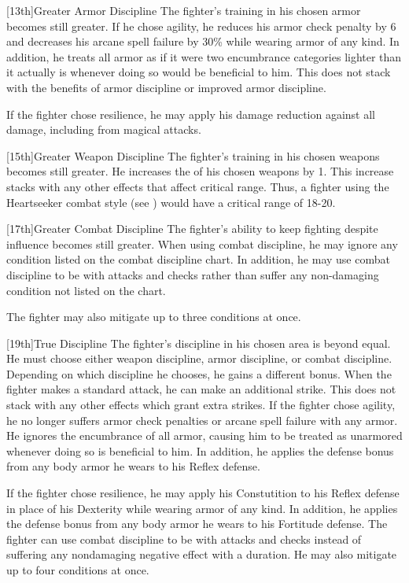[13th]{Greater Armor Discipline}
The fighter's training in his chosen armor becomes still greater.
If he chose agility, he reduces his armor check penalty by 6 and decreases his arcane spell failure by 30\% while wearing armor of any kind.
In addition, he treats all armor as if it were two encumbrance categories lighter than it actually is whenever doing so would be beneficial to him.
This does not stack with the benefits of armor discipline or improved armor discipline.

If the fighter chose resilience, he may apply his damage reduction against all damage, including from magical attacks.

[15th]{Greater Weapon Discipline}
The fighter's training in his chosen weapons becomes still greater.
He increases the  of his chosen weapons by 1.
This increase stacks with any other effects that affect critical range.
Thus, a fighter using the Heartseeker combat style (see ) would have a critical range of 18-20.

[17th]{Greater Combat Discipline}
The fighter's ability to keep fighting despite influence becomes still greater.
When using combat discipline, he may ignore any condition listed on the combat discipline chart.
In addition, he may use combat discipline to be \severelyimpaired with attacks and checks rather than suffer any non-damaging condition not listed on the chart.

\par The fighter may also mitigate up to three conditions at once.

[19th]{True Discipline}
The fighter's discipline in his chosen area is beyond equal.
He must choose either weapon discipline, armor discipline, or combat discipline.
Depending on which discipline he chooses, he gains a different bonus.
When the fighter makes a standard attack, he can make an additional strike.
This does not stack with any other effects which grant extra strikes.
If the fighter chose agility, he no longer suffers armor check penalties or arcane spell failure with any armor.
He ignores the encumbrance of all armor, causing him to be treated as unarmored whenever doing so is beneficial to him.
In addition, he applies the defense bonus from any body armor he wears to his Reflex defense.

If the fighter chose resilience, he may apply his Constutition to his Reflex defense in place of his Dexterity while wearing armor of any kind.
In addition, he applies the defense bonus from any body armor he wears to his Fortitude defense.
The fighter can use combat discipline to be \impaired with attacks and checks instead of suffering any nondamaging negative effect with a duration.
He may also mitigate up to four conditions at once.

